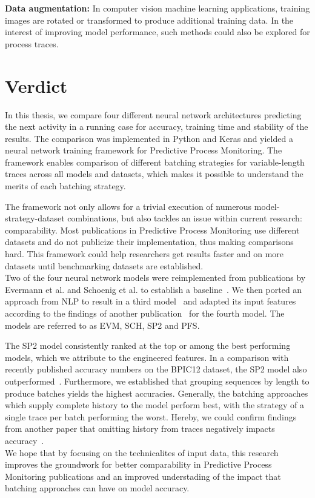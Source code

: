 \noindent\textbf{Data augmentation:} In computer vision machine learning applications, training images are rotated or transformed to produce additional training data. In the interest of improving model performance, such methods could also be explored for process traces.

\section{Verdict} \label{sec:conclusion:verdict}
In this thesis, we compare four different neural network architectures predicting the next activity in a running case for accuracy, training time and stability of the results. The comparison was implemented in Python and Keras and yielded a neural network training framework for Predictive Process Monitoring. The framework enables comparison of different batching strategies for variable-length traces across all models and datasets, which makes it possible to understand the merits of each batching strategy.

The framework not only allows for a trivial execution of numerous model-strategy-dataset combinations, but also tackles an issue within current research: comparability. Most publications in Predictive Process Monitoring use different datasets and do not publicize their implementation, thus making comparisons hard. This framework could help researchers get results faster and on more datasets until benchmarking datasets are established.\\

Two of the four neural network models were reimplemented from publications by Evermann et al. and Schoenig et al. to establish a baseline~\cite{evermann2016, schoenig2018}. We then ported an approach from NLP to result in a third model~\cite{shibata2016bipartite} and adapted its input features according to the findings of another publication~\cite{klinkmuller2018reliablemonitoring} for the fourth model. The models are referred to as EVM, SCH, SP2 and PFS.

The SP2 model consistently ranked at the top or among the best performing models, which we attribute to the engineered features. In a comparison with recently published accuracy numbers on the BPIC12 dataset, the SP2 model also outperformed~\cite{boehmer2018probability, evermann2016}. Furthermore, we established that grouping sequences by length to produce batches yields the highest accuracies. Generally, the batching approaches which supply complete history to the model perform best, with the strategy of a single trace per batch performing the worst. Hereby, we could confirm findings from another paper that omitting history from traces negatively impacts accuracy~\cite{klinkmuller2018reliablemonitoring}.\\

We hope that by focusing on the technicalites of input data, this research improves the groundwork for better comparability in Predictive Process Monitoring publications and an improved understading of the impact that batching approaches can have on model accuracy.
